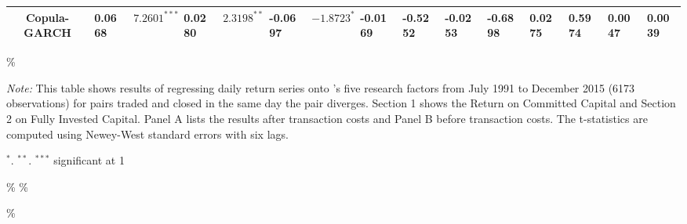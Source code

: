 \documentclass[a4paper]{article}
\begin{document}
\begin{sidewaystable}
\begin{threeparttable}[H]
\begin{tabularx}{\textwidth}{@{\extracolsep{\fill}}lllllllllllllll@{}}
				\multicolumn{1}{c}{Copula-GARCH} & 0.0668 & $7.2601^{***}$ & 0.0280 & $2.3198^{**}$ & -0.0697 & $-1.8723^{*}$ & -0.0169 & -0.5252 & -0.0253 & -0.6898 & 0.0275 & 0.5974 & 0.0047 & 0.0039 \\
				\bottomrule
			\end{tabularx}\%
			\begin{tablenotes}
				\item \textit{Note:} \scriptsize  This table shows results of regressing daily return series onto \citet*{ff15}'s five research factors from July 1991 to December 2015 (6173 observations) for pairs traded and closed in the same day the pair diverges. Section 1 shows the Return on Committed Capital and Section 2 on Fully Invested Capital. Panel A lists the results after transaction costs and Panel B before transaction costs. The t-statistics are computed using Newey-West standard errors with six lags.
				\item \scriptsize $^{\ast}$. $^{\ast\ast}$. $^{\ast\ast\ast}$  significant at 1\\%
			\end{tablenotes}
		\end{threeparttable}\%
		\label{tab:table111}\%
	\end{sidewaystable}\%
	
\end{document}
